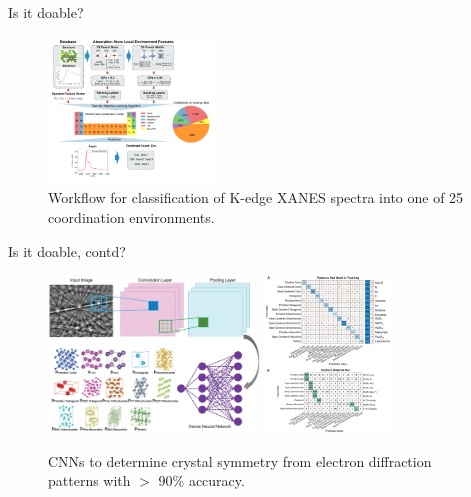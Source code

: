 \documentclass[aspectratio=169]{beamer}
\begin{document}
\begin{frame}{Is it doable?}
\begin{figure}
    \centering
    \includegraphics[width=0.4\textwidth]{figures/randomforestxanes.pdf}
    \caption{Workflow for classification of K-edge XANES spectra into one of 25 coordination environments.\cite{zhengRandomForestModels2020}}
\end{figure}
\end{frame}


\begin{frame}{Is it doable, contd?}
\begin{figure}
    \centering
    \includegraphics[width=0.5\textwidth]{figures/science-cnn-electron-diffraction.jpg}
    \includegraphics[width=0.3\textwidth]{figures/science-cnn-electron-diffraction2.jpg}
    \caption{CNNs to determine crystal symmetry from electron diffraction patterns with $>$ 90\% accuracy.\cite{kaufmannCrystalSymmetryDetermination2020}}
\end{figure}
\end{frame}
\end{document}
